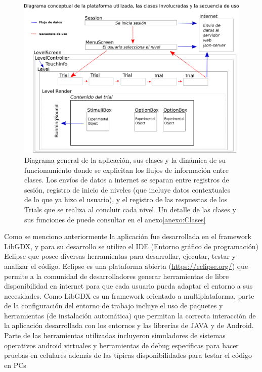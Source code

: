 \documentclass{article}
\numberwithin{figure}{section}
\begin{document}
    \begin{figure}
        \center
        \includegraphics[width=\textwidth]{Imagenes/FlujoJava.png}
        \caption{Diagrama general de la aplicación, sus clases y la dinámica de su funcionamiento donde se explicitan los flujos de información entre clases. Los envíos de datos a internet se separan entre registros de sesión, registro de inicio de niveles (que incluye datos contextuales de lo que ya hizo el usuario), y el registro de las respuestas de los Trials que se realiza al concluir cada nivel. Un detalle de las clases y sus funciones de puede consultar en el anexo\ref{anexo:Clases}}
        \label{fig:Flujo}
    \end{figure}

        
    Como se menciono anteriormente la aplicación fue desarrollada en el framework LibGDX, y para su desarrollo se utilizo el IDE (Entorno gráfico de programación) Eclipse que posee diversas herramientas para desarrollar, ejecutar, testar y analizar el código. Eclipse es una plataforma abierta (\url{https://eclipse.org/}) que permite a la comunidad de desarrolladores generar herramientas de libre disponibilidad en internet para que cada usuario pueda adaptar el entorno a sus necesidades. Como LibGDX es un framework orientado a multiplataforma, parte de la configuración del entorno de trabajo incluye el uso de paquetes y herramientas (de instalación automática) que permitan la correcta interacción de la aplicación desarrollada con los entornos y las librerías de JAVA y de Android. Parte de las herramientas utilizadas incluyeron simuladores de sistemas operativos android virtuales y herramientas de debug específicas para hacer pruebas en celulares además de las típicas disponibilidades para testar el código en PCs
    
\end{document}
